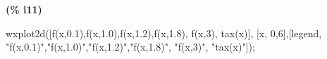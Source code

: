 \noindent
\begin{minipage}[t]{8ex}\color{red}\bf
(\% i11)
\end{minipage}
\begin{minipage}[t]{\textwidth}\color{blue}
wxplot2d([f(x,0.1),f(x,1.0),f(x,1.2),f(x,1.8), f(x,3), tax(x)], [x, 0,6],[legend, "f(x,0.1)","f(x,1.0)","f(x,1.2)","f(x,1.8)", "f(x,3)", "tax(x)"]);


\end{minipage}





